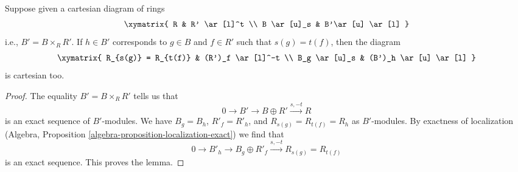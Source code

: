 \begin{lemma}
\label{lemma-diagram-localize}
Suppose given a cartesian diagram of rings
$$
\xymatrix{
R &
R' \ar[l]^t \\
B \ar[u]_s &
B'\ar[u] \ar[l]
}
$$
i.e., $B' = B \times_R R'$. If $h \in B'$ corresponds to $g \in B$
and $f \in R'$ such that $s(g) = t(f)$, then the diagram
$$
\xymatrix{
R_{s(g)} = R_{t(f)} &
(R')_f \ar[l]^-t \\
B_g \ar[u]_s &
(B')_h \ar[u] \ar[l]
}
$$
is cartesian too.
\end{lemma}

\begin{proof}
The equality $B' = B \times_R R'$ tells us that
$$
0 \to B' \to B \oplus R' \xrightarrow{s, -t} R
$$
is an exact sequence of $B'$-modules. We have $B_g = B_h$,
$R'_f = R'_h$, and $R_{s(g)} = R_{t(f)} = R_h$ as $B'$-modules.
By exactness of localization
(Algebra, Proposition \ref{algebra-proposition-localization-exact})
we find that
$$
0 \to B'_h \to B_g \oplus R'_f \xrightarrow{s, -t} R_{s(g)} = R_{t(f)}
$$
is an exact sequence. This proves the lemma.
\end{proof}

